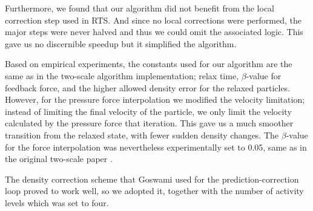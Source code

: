 \documentclass[../../main.tex]{subfiles}
\begin{document}
Furthermore, we found that our algorithm did not benefit from the local correction step used in RTS. And since no local corrections were performed, the major steps were never halved and thus we could omit the associated logic. This gave us no discernible speedup but it simplified the algorithm.

Based on empirical experiments, the constants used for our algorithm are the same as in the two-scale algorithm implementation; relax time, $\beta$-value for feedback force, and the higher allowed density error for the relaxed particles. However, for the pressure force interpolation we modified the velocity limitation; instead of limiting the final velocity of the particle, we only limit the velocity calculated by the pressure force that iteration. This gave us a much smoother transition from the relaxed state, with fewer sudden density changes. The $\beta$-value for the force interpolation was nevertheless experimentally set to 0.05, same as in the original two-scale paper \citep{solenthaler2011two}. 

The density correction scheme that Goswami used for the prediction-correction loop proved to work well, so we adopted it, together with the number of activity levels which was set to four. 


\end{document}

